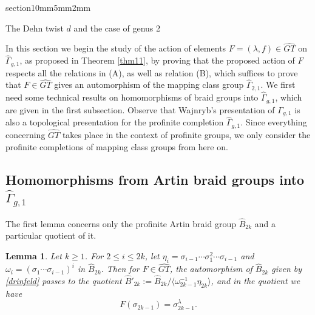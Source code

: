 \documentclass[a4paper,10pt,reqno]{amsart}
\makeatletter
\newcommand\GT{\widehat{GT}}
\newcommand\B{\widehat{B}}
\newcommand\Gone{\Gamma_{g,1}}
\newcommand\GGone{\widehat{\Gamma}_{g,1}}
\newtheorem{lem}[thm]{Lemma}
\renewcommand{\section}{\@startsection
{section}{1}{0mm}{5mm}{2mm}{\raggedright\bfseries}}
\makeatother
\begin{document}
\vspace{.3cm}

\section{The Dehn twist $d$ and the case of genus 2}

In this section we begin the study of the action of elements $F=(\lambda,f)\in \GT$
on $\GGone$, as proposed in Theorem \ref{thm11}, by proving that the proposed action of $F$ respects
all the relations in (A), as well as relation (B), which suffices to prove that $F\in\GT$ gives an 
automorphism of the mapping class group $\widehat\Gamma_{2,1}$. We first need some technical results
on homomorphisms of braid groups into $\GGone$, which are given in the first subsection. Observe that Wajnryb's presentation of $\Gone$ is also a topological
presentation for the profinite completion $\GGone$. Since everything concerning
$\GT$ takes place in the context of profinite groups, we only consider the
profinite completions of mapping class groups from here on.

\subsection{Homomorphisms from Artin braid groups into $\GGone$}

The first lemma concerns only the profinite Artin braid group $\B_{2k}$ and a particular quotient of it.
\begin{lem}\label{technical} Let $k\ge 1$. For $2\le i\le 2k$, let
$\eta_i=\sigma_{i-1}\cdots \sigma_1^2\cdots \sigma_{i-1}$ and
$\omega_i=(\sigma_1\cdots \sigma_{i-1})^i$ in $\B_{2k}$. Then
for $F\in \GT$, the automorphism of $\B_{2k}$ given by
\eqref{drinfeld} passes to the quotient $\B'_{2k}:=\B_{2k}/\langle
\omega_{2k-1}^{-1}\eta_{2k}\rangle$, and in the quotient we have
$$F(\sigma_{2k-1})=\sigma_{2k-1}^\lambda.$$
\end{lem}
\end{document}
